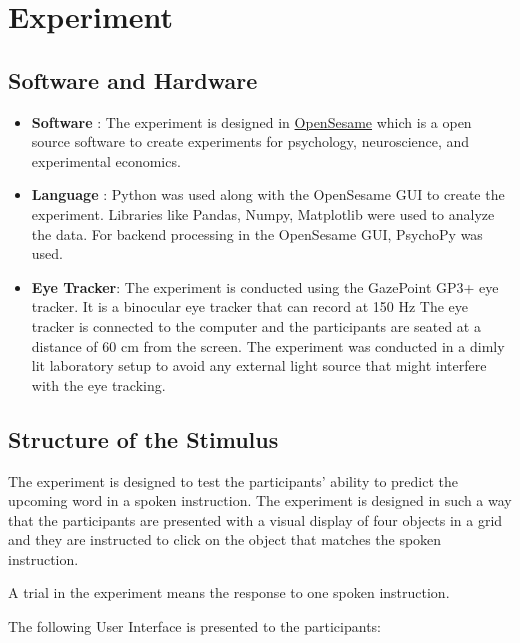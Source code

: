 \documentclass[
  a4paper,
]{article}
\begin{document}
\hypertarget{experiment}{%
\section{Experiment}\label{experiment}}

\hypertarget{software-and-hardware}{%
\subsection{Software and Hardware}\label{software-and-hardware}}

\begin{itemize}
\item
  \textbf{Software} : The experiment is designed in
  \href{https://osdoc.cogsci.nl/}{OpenSesame} which is a open source
  software to create experiments for psychology, neuroscience, and
  experimental economics.
\item
  \textbf{Language} : Python was used along with the OpenSesame GUI to
  create the experiment. Libraries like Pandas, Numpy, Matplotlib were
  used to analyze the data. For backend processing in the OpenSesame
  GUI, PsychoPy was used.
\item
  \textbf{Eye Tracker}: The experiment is conducted using the GazePoint
  GP3+ eye tracker. It is a binocular eye tracker that can record at 150
  Hz The eye tracker is connected to the computer and the participants
  are seated at a distance of 60 cm from the screen. The experiment was
  conducted in a dimly lit laboratory setup to avoid any external light
  source that might interfere with the eye tracking.
\end{itemize}

\hypertarget{structure-of-the-stimulus}{%
\subsection{Structure of the Stimulus}\label{structure-of-the-stimulus}}

The experiment is designed to test the participants' ability to predict
the upcoming word in a spoken instruction. The experiment is designed in
such a way that the participants are presented with a visual display of
four objects in a grid and they are instructed to click on the object
that matches the spoken instruction.

A trial in the experiment means the response to one spoken instruction.

The following User Interface is presented to the participants:
\end{document}
